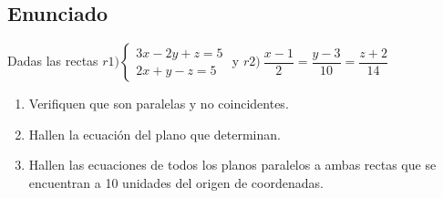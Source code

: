 \subsection{Enunciado}
\noindent Dadas las rectas $r1)
	\begin{cases}
		3x - 2y + z = 5 \\
		2x + y - z = 5
	\end{cases}$
y $r2) \ \dfrac{x - 1}{2} = \dfrac{y - 3}{10} = \dfrac{z + 2}{14}$

\begin{enumerate}
	\item Verifiquen que son paralelas y no coincidentes.
	\item Hallen la ecuación del plano que determinan.
	\item Hallen las ecuaciones de todos los planos paralelos a ambas rectas que se encuentran a 10 unidades del origen de coordenadas.
\end{enumerate}
